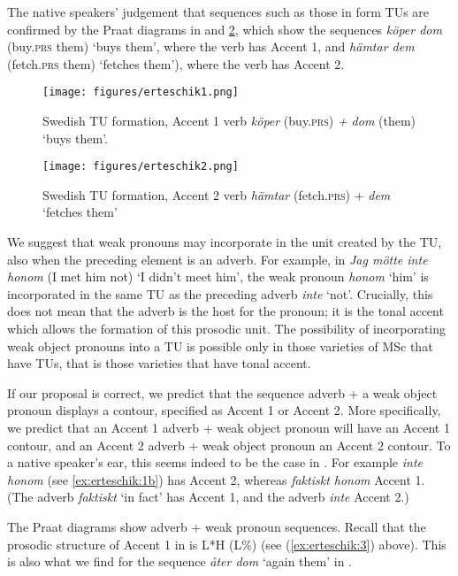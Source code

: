 \documentclass[output=paper]{LSP/langsci}
\begin{document}
The native speakers’ judgement that sequences such as those in  form TUs are confirmed by the Praat diagrams in  and \ref{fig:erteschik:2}, which show the sequences \textit{köper dom} (buy.\textsc{prs} them) ‘buys them’, where the verb has Accent 1, and \textit{hämtar dem} (fetch.\textsc{prs} them) ‘fetches them’), where the verb has Accent 2.

  
\begin{figure}
\texttt{[image: figures/erteschik1.png]}
\caption{Swedish TU formation, Accent 1 verb \textit{köper} (buy.\textsc{prs)} \textit{+ dom} (them) ‘buys them’.} 
\label{fig:erteschik:1}
\end{figure}

  

 

\begin{figure}
\texttt{[image: figures/erteschik2.png]}
\caption{Swedish TU formation, Accent 2 verb \textit{hämtar} (fetch.\textsc{prs}) + \textit{dem} ‘fetches them’}
\label{fig:erteschik:2}
\end{figure}

We suggest that weak pronouns may incorporate in the unit created by the TU, also when the preceding element is an adverb. For example, in  \textit{Jag mötte inte honom} (I met him not) ‘I didn’t meet him’, the weak pronoun \textit{honom} ‘him’ is incorporated in the same TU as the preceding adverb \textit{inte} ‘not’. Crucially, this does not mean that the adverb is the host for the pronoun; it is the tonal accent which allows the formation of this prosodic unit. The possibility of incorporating weak object pronouns into a TU is possible only in those varieties of MSc that have TUs, that is those varieties that have tonal accent.

  If our proposal is correct, we predict that the sequence adverb + a weak object pronoun displays a  contour, specified as Accent 1 or Accent 2. More specifically, we predict that an Accent 1 adverb + weak object pronoun will have an Accent 1 contour, and an Accent 2 adverb + weak object  pronoun an Accent 2 contour. To a native speaker’s ear, this seems indeed to be the case in . For example \textit{inte honom} (see \ref{ex:erteschik:1b}) has Accent 2, whereas \textit{faktiskt honom} Accent 1. (The adverb \textit{faktiskt} ‘in fact’ has Accent 1, and the adverb \textit{inte} Accent 2.) 

  The Praat diagrams show adverb + weak pronoun sequences. Recall that the prosodic structure of Accent 1 in  is L*H (L\%)  (see (\ref{ex:erteschik:3}) above). This is also what we find for the sequence \textit{åter dom} ‘again them’ in .
\end{document}
